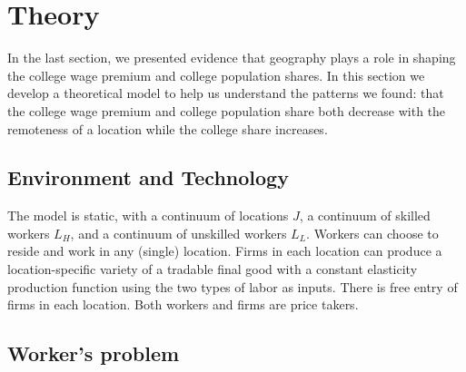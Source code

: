 \documentclass{article}
\begin{document}
\section{Theory}

In the last section, we presented evidence that geography plays a role in shaping the college wage premium and college population shares.  In this section we develop a theoretical model to help us understand the patterns we found: that the college wage premium and college population share both decrease with the remoteness of a location while the college share increases.

\subsection{Environment and Technology}

The model is static, with a continuum of locations $J$, a continuum of skilled workers $L_H$, and a continuum of unskilled workers $L_L$.  Workers can choose to reside and work in any (single) location.  Firms in each location can produce a location-specific variety of a tradable final good with a constant elasticity production function using the two types of labor as inputs.  There is free entry of firms in each location.  Both workers and firms are price takers.

\subsection{Worker's problem}
\end{document}
